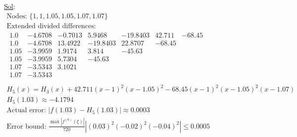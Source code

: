 \begin{enumerate}
\begin{enumerate}
\begin{enumerate}
            \underline{Sol}:\\
            \[
              \begin{array}{l}
                \text{Nodes: } \{1, 1, 1.05, 1.05, 1.07, 1.07\} \\
                \text{Extended divided differences:} \\
                \begin{array}{c|cccccc}
                  1.0 & -4.6708 & -0.7013 & 5.9468 & -19.8403 &
                  42.711 & -68.45 \\
                  1.0 & -4.6708 & 13.4922 & -19.8403 & 22.8707 & -68.45 & \\
                  1.05 & -3.9959 & 1.9174 & 3.814 & -45.63 & & \\
                  1.05 & -3.9959 & 5.7304 & -45.63 & & & \\
                  1.07 & -3.5343 & 3.1021 & & & & \\
                  1.07 & -3.5343 & & & & & \\
                \end{array} \\
                H_5(x) = H_3(x) + 42.711(x-1)^2(x-1.05)^2 -
                68.45(x-1)^2(x-1.05)^2(x-1.07) \\
                \boxed{H_5(1.03) \approx -4.1794} \\
                \text{Actual error: } |f(1.03) - H_5(1.03)| \approx 0.0003 \\
                \text{Error bound: } \frac{\max
                |f^{(6)}(\xi)|}{720}|(0.03)^2(-0.02)^2(-0.04)^2| \leq 0.0005
              \end{array}
            \]
        \end{enumerate}

    \end{enumerate}


\end{enumerate}
